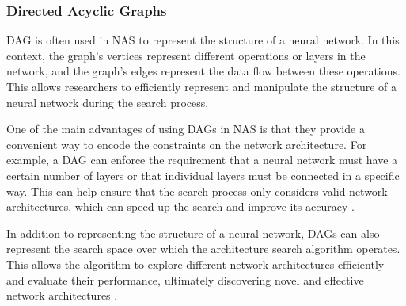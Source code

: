 \subsubsection{Directed Acyclic Graphs}
\Gls{DAG} is often used in NAS to represent the structure of a neural network. In this context, the graph's vertices represent different operations or layers in the network, and the graph's edges represent the data flow between these operations. This allows researchers to efficiently represent and manipulate the structure of a neural network during the search process.

One of the main advantages of using DAGs in NAS is that they provide a convenient way to encode the constraints on the network architecture. For example, a DAG can enforce the requirement that a neural network must have a certain number of layers or that individual layers must be connected in a specific way. This can help ensure that the search process only considers valid network architectures, which can speed up the search and improve its accuracy \autocite{https://doi.org/10.48550/arxiv.1806.09055}. 

In addition to representing the structure of a neural network, DAGs can also represent the search space over which the architecture search algorithm operates. This allows the algorithm to explore different network architectures efficiently and evaluate their performance, ultimately discovering novel and effective network architectures \autocite{inproceedings}. 
